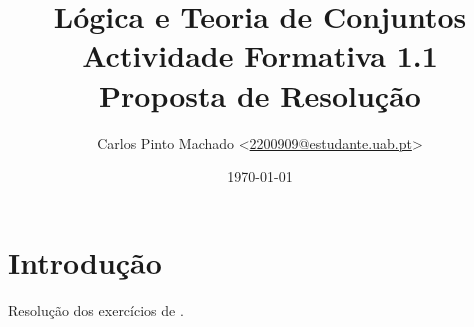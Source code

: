 \documentclass[11pt, a4paper]{article}
\title{
	Lógica e Teoria de Conjuntos\\
	Actividade Formativa 1.1\\
	Proposta de Resolução
}
\author{
	Carlos Pinto Machado
	<\href{mailto:2200909@estudante.uab.pt}{2200909@estudante.uab.pt}>
}
\date{\today}
\begin{document}
\maketitle

\section*{Introdução}

\paragraph{} Resolução dos exercícios de \cite[secção 1.1 Linguagem]{Edmundo2021}.








\clearpage

\printbibliography[title={Bibliografia},heading=bibintoc]
\end{document}
